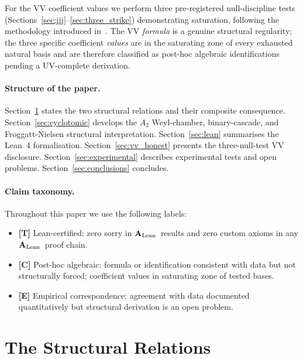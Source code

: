 \documentclass[11pt]{article}
\theoremstyle{remark}
\newcommand{\CatAL}{\ensuremath{\textbf{A}_{\rm Lean}}}
\begin{document}
For the VV coefficient values we perform three pre-registered null-discipline tests
(Sections~\ref{sec:jjj}--\ref{sec:three_strike}) demonstrating saturation, following
the methodology introduced in~\cite{Spivack2026_SM_UGP}.  The VV \emph{formula} is a
genuine structural regularity; the three specific coefficient \emph{values} are in the
saturating zone of every exhausted natural basis and are therefore classified as
post-hoc algebraic identifications pending a UV-complete derivation.

\paragraph{Structure of the paper.}
Section~\ref{sec:relations} states the two structural relations and their
composite consequence.
Section~\ref{sec:cyclotomic} develops the $A_2$ Weyl-chamber, binary-cascade,
and Froggatt-Nielsen structural interpretation.
Section~\ref{sec:lean} summarises the Lean~4 formalisation.
Section~\ref{sec:vv_honest} presents the three-null-test VV disclosure.
Section~\ref{sec:experimental} describes experimental tests and open problems.
Section~\ref{sec:conclusions} concludes.

\paragraph{Claim taxonomy.}
Throughout this paper we use the following labels:
\begin{itemize}
  \item \textbf{[T]} Lean-certified: zero sorry in \CatAL\ results and zero custom axioms in any \CatAL\ proof chain.
  \item \textbf{[C]} Post-hoc algebraic: formula or identification consistent
    with data but not structurally forced; coefficient values in saturating zone
    of tested bases.
  \item \textbf{[E]} Empirical correspondence: agreement with data documented
    quantitatively but structural derivation is an open problem.
\end{itemize}

\section{The Structural Relations}
\label{sec:relations}
\end{document}
